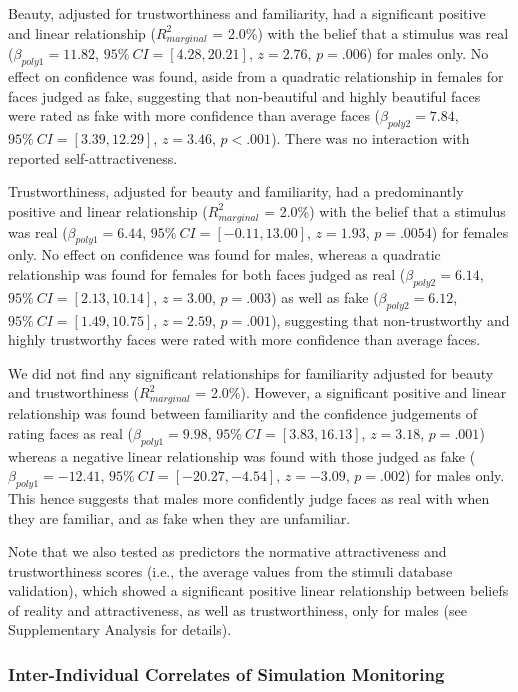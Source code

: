 \documentclass[
  man,floatsintext]{apa6}
\begin{document}
Beauty, adjusted for trustworthiness and familiarity, had a significant positive and linear relationship (\(R^2_{marginal}\) = 2.0\%) with the belief that a stimulus was real (\(\beta_{poly1} = 11.82\), \(95\%~CI = [4.28, 20.21]\), \(z = 2.76\), \(p = .006\)) for males only. No effect on confidence was found, aside from a quadratic relationship in females for faces judged as fake, suggesting that non-beautiful and highly beautiful faces were rated as fake with more confidence than average faces (\(\beta_{poly2} = 7.84\), \(95\%~CI = [3.39, 12.29]\), \(z = 3.46\), \(p < .001\)). There was no interaction with reported self-attractiveness.

Trustworthiness, adjusted for beauty and familiarity, had a predominantly positive and linear relationship (\(R^2_{marginal}\) = 2.0\%) with the belief that a stimulus was real (\(\beta_{poly1} = 6.44\), \(95\%~CI = [-0.11, 13.00]\), \(z = 1.93\), \(p = .0054\)) for females only. No effect on confidence was found for males, whereas a quadratic relationship was found for females for both faces judged as real (\(\beta_{poly2} = 6.14\), \(95\%~CI = [2.13, 10.14]\), \(z = 3.00\), \(p = .003\)) as well as fake (\(\beta_{poly2} =6.12\), \(95\%~CI = [1.49, 10.75]\), \(z = 2.59\), \(p = .001\)), suggesting that non-trustworthy and highly trustworthy faces were rated with more confidence than average faces.

We did not find any significant relationships for familiarity adjusted for beauty and trustworthiness (\(R^2_{marginal}\) = 2.0\%). However, a significant positive and linear relationship was found between familiarity and the confidence judgements of rating faces as real (\(\beta_{poly1} = 9.98\), \(95\%~CI = [3.83, 16.13]\), \(z = 3.18\), \(p = .001\)) whereas a negative linear relationship was found with those judged as fake (\(\beta_{poly1} = -12.41\), \(95\%~CI = [-20.27, -4.54]\), \(z = -3.09\), \(p = .002\)) for males only. This hence suggests that males more confidently judge faces as real with when they are familiar, and as fake when they are unfamiliar.

Note that we also tested as predictors the normative attractiveness and trustworthiness scores (i.e., the average values from the stimuli database validation), which showed a significant positive linear relationship between beliefs of reality and attractiveness, as well as trustworthiness, only for males (see Supplementary Analysis for details).

\hypertarget{inter-individual-correlates-of-simulation-monitoring}{%
\subsubsection{Inter-Individual Correlates of Simulation Monitoring}\label{inter-individual-correlates-of-simulation-monitoring}}
\end{document}
